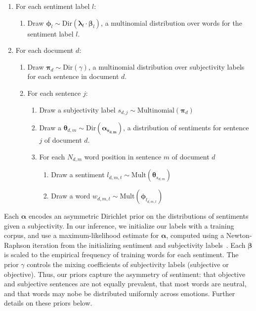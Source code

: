 \documentclass{article}
\begin{document}
\begin{enumerate}
\item For each sentiment label $l$:
\begin{enumerate}
\item Draw $\mathbf{\phi}_l \sim \mbox{Dir}(\mathbf{\lambda}_l \cdot \mathbf{\beta}_l)$, a multinomial distribution over words for the sentiment label $l$.
\end{enumerate}
\item For each document $d$:
\begin{enumerate}
\item Draw $\mathbf{\pi}_d \sim \mbox{Dir}(\gamma)$, a multinomial distribution over subjectivity labels for each sentence in document $d$.
\item For each sentence $j$:
\begin{enumerate}
\item Draw a subjectivity label $s_{d,j} \sim \mbox{Multinomial}(\mathbf{\pi}_d)$
\item Draw a $\mathbf{\theta}_{d,m} \sim \mbox{Dir}(\mathbf{\alpha_{s_{d,m}}})$, a distribution of sentiments for sentence $j$ of document $d$. 
\item For each $N_{d,m}$ word position in sentence $m$ of document $d$
\begin{enumerate}
\item Draw a sentiment $l_{d,m,t} \sim \mbox{Mult}(\mathbf{\theta}_{s_{d,m}})$
\item Draw a word $w_{d,m,t} \sim \mbox{Mult}(\mathbf{\phi}_{l_{d,m,t}})$
\end{enumerate}
\end{enumerate}
\end{enumerate}
\end{enumerate}

Each $\mathbf{\alpha}$ encodes an asymmetric Dirichlet prior on the
distributions of sentiments given a subjectivity. In our inference,
we initialize our labels with a training corpus, and use a
maximum-likelihood estimate for $\mathbf{\alpha}$, computed using
a Newton-Raphson iteration from the initializing sentiment and
subjectivity labels~\citep{minka00}. Each $\mathbf{\beta}$ is
scaled to the empirical frequency of training words for each
sentiment. The prior $\gamma$ controls the mixing coefficients of
subjectivity labels (subjective or objective). Thus, our priors
capture the asymmetry of sentiment: that objective and subjective
sentences are not equally prevalent, that most words are neutral,
and that words may nobe be distributed uniformly across emotions.
Further details on these priors below.
\end{document}
